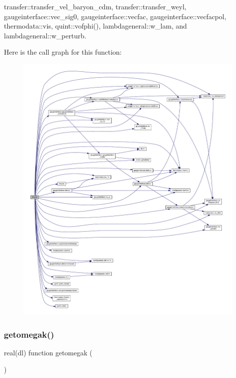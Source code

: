 transfer\+::transfer\+\_\+vel\+\_\+baryon\+\_\+cdm, transfer\+::transfer\+\_\+weyl, gaugeinterface\+::vec\+\_\+sig0, gaugeinterface\+::vecfac, gaugeinterface\+::vecfacpol, thermodata\+::vis, quint\+::vofphi(), lambdageneral\+::w\+\_\+lam, and lambdageneral\+::w\+\_\+perturb.

Here is the call graph for this function\+:
\nopagebreak
\begin{figure}[H]
\begin{center}
\leavevmode
\includegraphics[width=350pt]{equations__bde__v3__nopert_8f90_a1c228811398a4401bb57d778911a13df_cgraph}
\end{center}
\end{figure}
\mbox{\label{equations__bde__v3__nopert_8f90_a2c95a3b42a68aa87a21097ce3ff8bbe6}} 
\subsubsection{\texorpdfstring{getomegak()}{getomegak()}}
{\footnotesize\ttfamily real(dl) function getomegak (\begin{DoxyParamCaption}{ }\end{DoxyParamCaption})}



